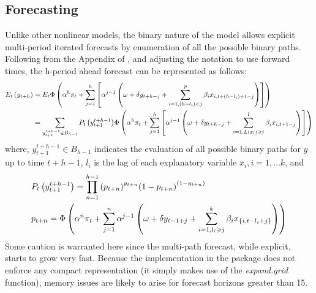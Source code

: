 \subsection{Forecasting}
Unlike other nonlinear models, the binary nature of the model allows explicit multi-period iterated forecasts by enumeration of all the possible binary paths. Following from the Appendix of \cite{Kauppi2008}, and adjusting the notation to use forward times, the h-period ahead forecast can be represented as follows:
\begin{equation}
\begin{aligned}
  {E_t}\left( {{y_{t + h}}} \right) &= {E_t}\Phi \left( {{\alpha ^h}{\pi _t} + \sum\limits_{j = 1}^h {\left[ {{\alpha ^{j - 1}}\left( {\omega  + \delta {y_{t + h - j}} + \sum\limits_{i = 1,(h - {l_i}) < j}^p {{\beta _i}{x_{i,t + \left( {h - {l_i}} \right) + 1 - j}}} } \right)} \right]} } \right) \hfill \\
   &= \sum\limits_{y_{t + 1}^{t + h - 1} \in {B_{h - 1}}} {{P_t}\left( {y_{t + 1}^{t + h - 1}} \right)} \Phi \left( {{\alpha ^h}{\pi _t} + \sum\limits_{j = 1}^h {\left[ {{\alpha ^{j - 1}}\left( {\omega  + \delta {y_{t + h - j}} + \sum\limits_{i = 1,L\left( {{x_i}} \right) \geqslant j}^l {{\beta _i}{x_{i,t + 1 - j}}} } \right)} \right]} } \right) \hfill \\
\end{aligned}
\end{equation}
where, ${y_{t + 1}^{t + h - 1} \in {B_{h - 1}}}$ indicates the evaluation of all possible binary paths for $y$ up to time $t+h-1$, $l_i$ is the lag of each explanatory variable $x_i,i=1,\ldots k$, and
\begin{equation}
\begin{gathered}
  {P_t}\left( {y_{t + 1}^{t + h - 1}} \right) = \prod\limits_{n = 1}^{h - 1} {{{\left( {{p_{t + n}}} \right)}^{{y_{t + n}}}}{{\left( {1 - {p_{t + n}}} \right)}^{\left( {1 - {y_{t + n}}} \right)}}}  \hfill \\
  {p_{t + n}} = \Phi \left( {{\alpha ^n}{\pi _t} + \sum\limits_{j = 1}^n {{\alpha ^{j - 1}}\left( {\omega  + \delta {y_{t - 1 + j}} + \sum\limits_{i = 1,{l_i} \geqslant j}^k {{\beta _i}{x_{\left\{ {i,t - {l_i} + j} \right\}}}} } \right)} } \right) \hfill \\
\end{gathered}
\end{equation}
Some caution is warranted here since the multi-path forecast, while explicit, starts to grow very fast. Because the implementation in the \verb@dbm@ package does not enforce any compact representation (it simply makes use of the \emph{expand.grid} function), memory issues are likely to arise for forecast horizons greater than 15.
